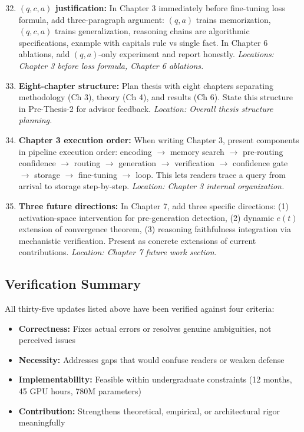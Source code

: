 \documentclass[11pt,a4paper]{article}
\begin{document}
\begin{enumerate}
\setcounter{enumi}{31}
\item \textbf{$(q,c,a)$ justification:} In Chapter 3 immediately before fine-tuning loss formula, add three-paragraph argument: $(q,a)$ trains memorization, $(q,c,a)$ trains generalization, reasoning chains are algorithmic specifications, example with capitals rule vs single fact. In Chapter 6 ablations, add $(q,a)$-only experiment and report honestly. \textit{Locations: Chapter 3 before loss formula, Chapter 6 ablations.}

\item \textbf{Eight-chapter structure:} Plan thesis with eight chapters separating methodology (Ch 3), theory (Ch 4), and results (Ch 6). State this structure in Pre-Thesis-2 for advisor feedback. \textit{Location: Overall thesis structure planning.}

\item \textbf{Chapter 3 execution order:} When writing Chapter 3, present components in pipeline execution order: encoding $\to$ memory search $\to$ pre-routing confidence $\to$ routing $\to$ generation $\to$ verification $\to$ confidence gate $\to$ storage $\to$ fine-tuning $\to$ loop. This lets readers trace a query from arrival to storage step-by-step. \textit{Location: Chapter 3 internal organization.}

\item \textbf{Three future directions:} In Chapter 7, add three specific directions: (1) activation-space intervention for pre-generation detection, (2) dynamic $e(t)$ extension of convergence theorem, (3) reasoning faithfulness integration via mechanistic verification. Present as concrete extensions of current contributions. \textit{Location: Chapter 7 future work section.}
\end{enumerate}

\subsection{Verification Summary}

All thirty-five updates listed above have been verified against four criteria:

\begin{itemize}
\item \textbf{Correctness:} Fixes actual errors or resolves genuine ambiguities, not perceived issues
\item \textbf{Necessity:} Addresses gaps that would confuse readers or weaken defense
\item \textbf{Implementability:} Feasible within undergraduate constraints (12 months, 45 GPU hours, 780M parameters)
\item \textbf{Contribution:} Strengthens theoretical, empirical, or architectural rigor meaningfully
\end{itemize}
\end{document}
